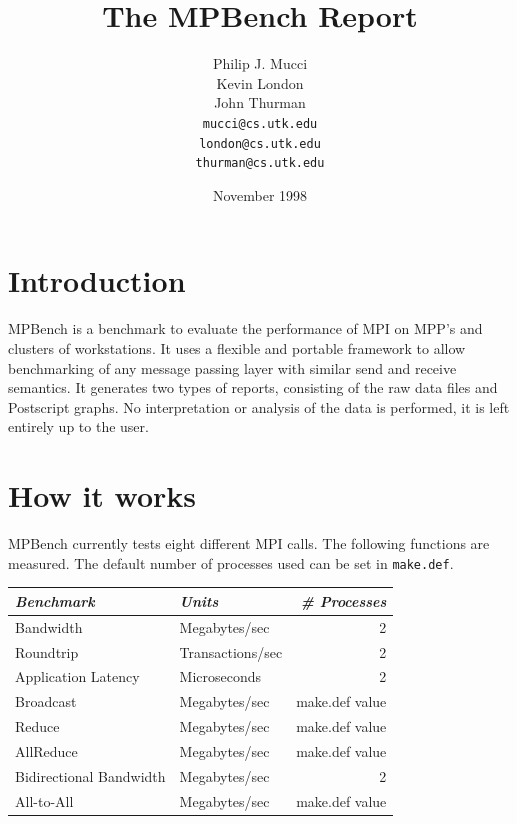 \documentclass [12pt]{article}
\begin{document}
\title{The MPBench Report}
\author {Philip J. Mucci \\
	Kevin London \\
	John Thurman \\
        {\tt mucci@cs.utk.edu} \\
	{\tt london@cs.utk.edu} \\
	{\tt thurman@cs.utk.edu}}

\date{November 1998}

\maketitle

\section{Introduction}

MPBench is a benchmark to evaluate the performance of MPI
on MPP's and clusters of workstations. It uses a flexible
and portable framework to allow benchmarking of any message passing
layer with similar send and receive semantics. It generates two types
of reports, consisting of the raw data files and Postscript
graphs. No interpretation or analysis of the data is performed, it is
left entirely up to the user.

\section{How it works}

MPBench currently tests eight different MPI calls. The following functions are measured.  
The default number of processes used can be set in {\tt make.def}. \\

\begin{center}
\begin{tabular}{|l|l|r|} \hline
{\em Benchmark} & {\em Units } & {\em \# Processes}\\ \hline
Bandwidth & Megabytes/sec  & 2 \\ \hline
Roundtrip & Transactions/sec & 2 \\ \hline
Application Latency & Microseconds & 2 \\ \hline
Broadcast & Megabytes/sec & make.def value \\ \hline
Reduce & Megabytes/sec & make.def value \\ \hline
AllReduce & Megabytes/sec & make.def value \\ \hline
Bidirectional Bandwidth & Megabytes/sec & 2 \\ \hline
All-to-All & Megabytes/sec & make.def value \\ \hline
\end{tabular}
\end{center}
\end{document}

